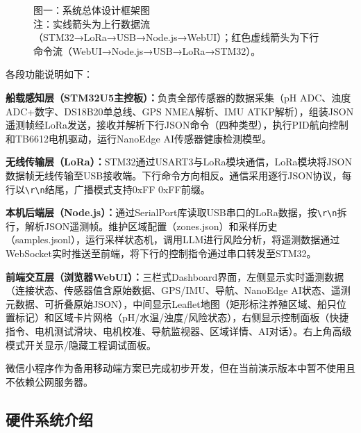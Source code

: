 \documentclass[12pt,a4paper]{ctexart}
\begin{document}
\begin{figure}[H]
{%
}
\caption{图一：系统总体设计框架图\\注：实线箭头为上行数据流（STM32→LoRa→USB→Node.js→WebUI）；红色虚线箭头为下行命令流（WebUI→Node.js→USB→LoRa→STM32）。}
\label{fig:arch}
\end{figure}

各段功能说明如下：

\textbf{船载感知层（STM32U5主控板）：}负责全部传感器的数据采集（pH ADC、浊度 ADC+数字、DS18B20单总线、GPS NMEA解析、IMU ATKP解析），组装JSON遥测帧经LoRa发送，接收并解析下行JSON命令（四种类型），执行PID航向控制和TB6612电机驱动，运行NanoEdge AI传感器健康检测模型。

\textbf{无线传输层（LoRa）：}STM32通过USART3与LoRa模块通信，LoRa模块将JSON数据帧无线传输至USB接收端。下行命令方向相反。通信采用逐行JSON协议，每行以\texttt{\textbackslash r\textbackslash n}结尾，广播模式支持0xFF 0xFF前缀。

\textbf{本机后端层（Node.js）：}通过SerialPort库读取USB串口的LoRa数据，按\texttt{\textbackslash r\textbackslash n}拆行，解析JSON遥测帧。维护区域配置（zones.json）和采样历史（samples.jsonl），运行采样状态机，调用LLM进行风险分析，将遥测数据通过WebSocket实时推送至前端，将下行的控制指令通过串口转发至STM32。

\textbf{前端交互层（浏览器WebUI）：}三栏式Dashboard界面，左侧显示实时遥测数据（连接状态、传感器值含原始数据、GPS/IMU、导航、NanoEdge AI状态、遥测元数据、可折叠原始JSON），中间显示Leaflet地图（矩形标注养殖区域、船只位置标记）和区域卡片网格（pH/水温/浊度/风险状态），右侧显示控制面板（快捷指令、电机测试滑块、电机校准、导航监视器、区域详情、AI对话）。右上角高级模式开关显示/隐藏工程调试面板。

微信小程序作为备用移动端方案已完成初步开发，但在当前演示版本中暂不使用且不依赖公网服务器。

\subsection{硬件系统介绍}
\end{document}
